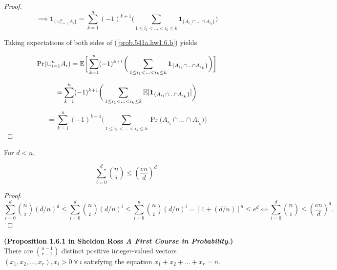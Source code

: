 \begin{theorem}
\begin{proof}
\begin{equation} \label{prob.541a.hw1.6.b}
\implies \boldsymbol{1}_{\{\cup_{i=1}^n A_i\}} = \sum_{k=1}^n (-1)^{k+1} \bigg( \sum_{1 \leq i_1 < \ldots < i_k \leq k} \boldsymbol{1}_{\{A_{i_1} \cap \ldots \cap A_{i_k}\}}\bigg)
\end{equation}

Taking expectations of both sides of (\ref{prob.541a.hw1.6.b}) yields

\[
\Pr(\cup_{i=1}^{n}A_{i}) = \mathbb{E} \bigg[ \sum_{k=1}^n (-1)^{k+1} \bigg( \sum_{1 \leq i_1 < \ldots < i_k \leq k} \boldsymbol{1}_{\{A_{i_1} \cap \ldots \cap A_{i_k}\}}\bigg)\bigg]
\]

\[
= \sum_{k=1}^n (-1)^{k+1} \bigg( \sum_{1 \leq i_1 < \ldots < i_k \leq k} \mathbb{E} [ \boldsymbol{1}_{\{A_{i_1} \cap \ldots \cap A_{i_k}\}} ] \bigg)
\]

\[
= \sum_{k=1}^n (-1)^{k+1} \bigg( \sum_{1 \leq i_1 < \ldots < i_k \leq k} \Pr \big(A_{i_1} \cap \ldots \cap A_{i_k} \big) \bigg)
\]

\end{proof}

\end{theorem}

\begin{proposition}

For \(d < n\),

\[
\sum_{i=0}^d \binom{n}{i}  \leq \left( \frac{en}{d} \right)^d.
\]

\end{proposition}

\begin{proof}

\[
\sum_{i=0}^d \binom{n}{i} (d/n)^d \leq \sum_{i=0}^d \binom{n}{i} (d/n)^i \leq \sum_{i=0}^n \binom{n}{i} (d/n)^i  = [1 + (d/n)]^n \leq e^d \iff \sum_{i=0}^d \binom{n}{i}  \leq \left( \frac{en}{d} \right)^d.
\]

\end{proof}

\begin{proposition} \label{prob.ross1.6.1} \textbf{(Proposition 1.6.1 in Sheldon Ross \textit{A First Course in Probability}.)} There are \(\binom{n-1}{r-1}\) distinct positive integer-valued vectors \((x_1, x_2, \ldots, x_r), x_i > 0 \ \forall \ i\) satisfying the equation \(x_1 + x_2 + \ldots + x_r = n\).

\end{proposition}

